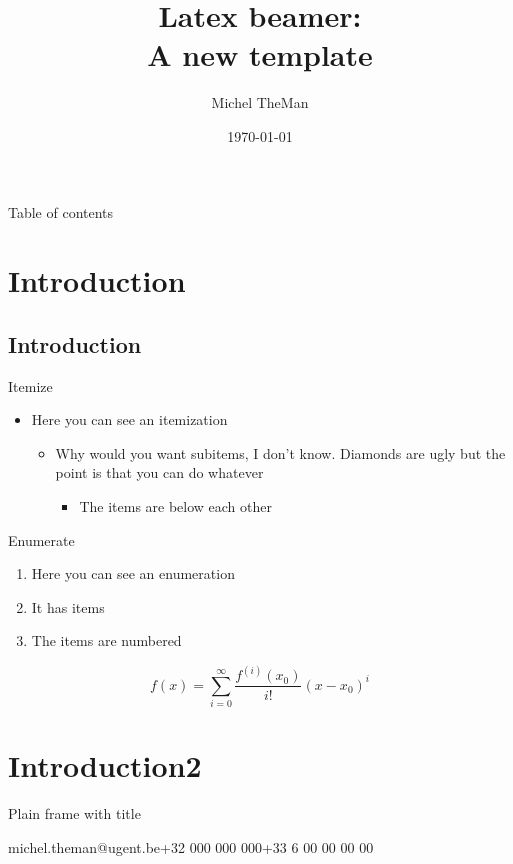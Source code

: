 \documentclass[ aspectratio=169]{beamer}
\title{Latex beamer:\\ A new template}
\date{\today}
\author{Michel TheMan}
\institute{\textbf{Department of Environment}\\Laboratory of Wood Technology, UGent-Woodlab }
\begin{document}
\frame{\titlepage} 
\begin{frame}{Table of contents}
	\tableofcontents
\end{frame} 
 
\section{Introduction}
\subsection{Introduction}
  
\begin{frame}[fragile, t]{Itemize}    
\begin{itemize}
\item Here you can see an itemization
\begin{itemize}
\item Why would you want subitems, I don't know. Diamonds are ugly but the point is that you can do whatever
\begin{itemize}
\item The items are below each other
\end{itemize}
\end{itemize}
\end{itemize}
\end{frame}
 
\begin{frame}{Enumerate}
\begin{enumerate}
\item Here you can see an enumeration 
\item It has items
\item The items are numbered    
\end{enumerate}
\[
	f(x)=\sum_{i=0}^\infty \frac{f^{(i)}(x_0)}{i!}(x-x_0)^i
\]
\end{frame}
  
\section{Introduction2}     
   
\begin{frame}[t]{Plain frame with title}
\lipsum[1] 
\end{frame}

	{michel.theman@ugent.be}{+32 000 000 000}{+33 6 00 00 00 00}    
\end{document}
